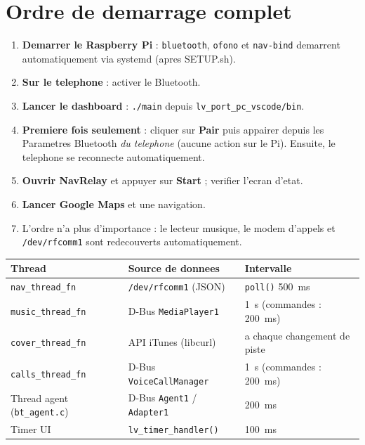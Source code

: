 \documentclass[a4paper,11pt]{article}
\begin{document}
\section{Ordre de demarrage complet}

\begin{enumerate}
  \item \textbf{Demarrer le Raspberry Pi} : \texttt{bluetooth}, \texttt{ofono} et
    \texttt{nav-bind} demarrent automatiquement via systemd (apres SETUP.sh).
  \item \textbf{Sur le telephone} : activer le Bluetooth.
  \item \textbf{Lancer le dashboard} : \texttt{./main} depuis \texttt{lv\_port\_pc\_vscode/bin}.
  \item \textbf{Premiere fois seulement} : cliquer sur \textbf{Pair} puis appairer depuis
    les Parametres Bluetooth \emph{du telephone} (aucune action sur le Pi).
    Ensuite, le telephone se reconnecte automatiquement.
  \item \textbf{Ouvrir NavRelay} et appuyer sur \textbf{Start} ; verifier l'ecran d'etat.
  \item \textbf{Lancer Google Maps} et une navigation.
  \item L'ordre n'a plus d'importance : le lecteur musique, le modem d'appels et
    \texttt{/dev/rfcomm1} sont redecouverts automatiquement.
\end{enumerate}

\begin{center}
\begin{tabular}{lll}
\toprule
\textbf{Thread} & \textbf{Source de donnees} & \textbf{Intervalle} \\
\midrule
\texttt{nav\_thread\_fn} & \texttt{/dev/rfcomm1} (JSON) & \texttt{poll()} 500~ms \\
\texttt{music\_thread\_fn} & D-Bus \texttt{MediaPlayer1} & 1~s (commandes : 200~ms) \\
\texttt{cover\_thread\_fn} & API iTunes (libcurl) & a chaque changement de piste \\
\texttt{calls\_thread\_fn} & D-Bus \texttt{VoiceCallManager} & 1~s (commandes : 200~ms) \\
Thread agent (\texttt{bt\_agent.c}) & D-Bus \texttt{Agent1} / \texttt{Adapter1} & 200~ms \\
Timer UI & \texttt{lv\_timer\_handler()} & 100~ms \\
\bottomrule
\end{tabular}
\end{center}
\end{document}
